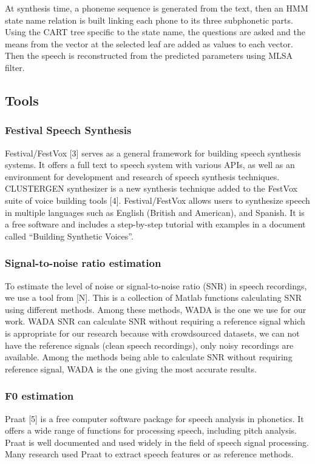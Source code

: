 \documentclass[12pt]{article}
\begin{document}
At synthesis time, a phoneme sequence is generated from the text, then an HMM state name relation is built linking each phone to its three subphonetic parts. Using the CART tree specific to the state name, the questions are asked and the means from the vector at the selected leaf are added as values to each vector. Then the speech is reconstructed from the predicted parameters using MLSA filter.

\subsection{Tools}

\subsubsection{Festival Speech Synthesis}
Festival/FestVox [3] serves as a general framework for building speech synthesis systems. It offers a full text to speech system with various APIs, as well as an environment for development and research of speech synthesis techniques. CLUSTERGEN synthesizer is a new synthesis technique added to the FestVox suite of voice building tools [4]. Festival/FestVox allows users to synthesize speech in multiple languages such as English (British and American), and Spanish. It is a free software and includes a step-by-step tutorial with examples in a document called “Building Synthetic Voices”.

\subsubsection{Signal-to-noise ratio estimation}
To estimate the level of noise or signal-to-noise ratio (SNR) in speech recordings, we use a tool from [N]. This is a collection of Matlab functions calculating SNR using different methods. Among these methods, WADA is the one we use for our work. WADA SNR can calculate SNR without requiring a reference signal which is appropriate for our research because with crowdsourced datasets, we can not have the reference signals (clean speech recordings), only noisy recordings are available. Among the methods being able to calculate SNR without requiring reference signal, WADA is the one giving the most accurate results.

\subsubsection{F0 estimation}
Praat [5] is a free computer software package for speech analysis in phonetics. It offers a wide range of functions for processing speech, including pitch analysis. Praat is well documented and used widely in the field of speech signal processing. Many research used Praat to extract speech features or as reference methods.
\end{document}
